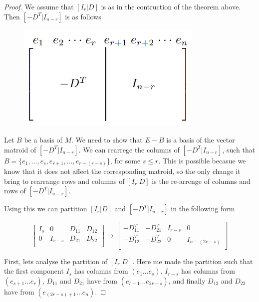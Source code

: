 \begin{proof}
    We assume that $[I_r|D]$ is as in the contruction of the theorem above. Then $[-D^T|I_{n-r}]$ is as follows
    \begin{figure}[h]
        \centering
        \includegraphics{Sections/VMRDual.png}
    \end{figure}

    Let $B$ be a basis of $M$. We need to show that $E-B$ is a basis of the vector matroid of $[-D^T|I_{n-r}]$. We can rearrege the columns of $[-D^T|I_{n-r}]$, such that $B=\{e_1,\dots,e_s, e_{r+1}, \dots , e_{r+(r-s)}$\}, for some $s \leq r$. This is possible becasue we know that it does not affect the corresponding matroid, so the only change it bring to rearrange rows and columns of $[I_r|D]$ is the re-arrenge of columns and rows of $[-D^T|I_{n-r}]$. 
    
    Using this we can partition $[I_r|D]$ and $[-D^T|I_{n-r}]$ in the following form
    \begin{figure}[H]
    $$\begin{bmatrix}
    I_s & 0 & D_{11} & D_{12}\\
    0 & I_{r-s} & D_{21} & D_{22}\\
    \end{bmatrix}
    \rightarrow
    \begin{bmatrix}
    -D_{11}^T & -D_{21}^T & I_{r-s} & 0\\
    -D_{12}^T & -D_{22}^T & 0 & I_{n-(2r-s)}\\
    \end{bmatrix}$$
    \end{figure}
    First, lets analyse the partition of $[I_r|D]$.
    Here me made the partition such that the first component $I_s$ has columns from $(e_1 \dots e_s)$. $I_{r-s}$ has columns from $(e_{s+1} \dots e_r)$, $D_11$ and $D_21$ have from $(e_{r+1} \dots e_{2r-s})$, and finally $D_12$ and $D_22$ have from $(e_{(2r-s)+1} \dots e_n)$.
    

\end{proof}
